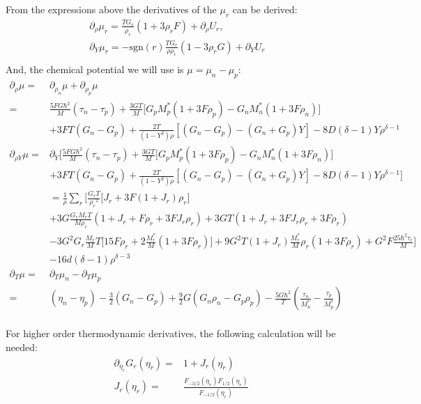 \documentclass[preprint,prc,preprintnumbers,superscriptaddress,amsmath,amssymb,floatfix]{revtex4-1}
\begin{document}
From the expressions above the derivatives of the $\mu_r$ can be derived:
\begin{equation}
 \begin{split}
  \partial_{\rho}\mu_r=\frac{TG_r}{\rho_r}(1+ 3\rho_r F)+\partial_{\rho}U_r,\\
  \partial_{Y}\mu_r=-\text{sgn}(r)\frac{TG_r}{\rho \rho_r}(1-3\rho_r G)+\partial_{Y}U_r&\\
 \end{split}
\end{equation}
And, the chemical potential we will use is $\mu = \mu_n-\mu_p$:
\begin{equation}
 \begin{split}
  \partial_\rho \mu=&\partial_{\rho_n} \mu+\partial_{\rho_p} \mu\\
  =&\frac{5 FG\hbar^2}{M}(\tau_n-\tau_p)+\frac{3GT}{M}\Big[G_p M^{*}_p (1+3F\rho_p)-G_n M^{*}_n(1+3F\rho_n)\Big]\\
  &+3FT(G_n-G_p)+\frac{2T}{(1-Y^2)\rho}[(G_n-G_p)-(G_n+G_p)Y]-8D(\delta-1)Y\rho^{\delta-1}\\
  \partial_{\rho Y} \mu=&\partial_Y\Big[\frac{5 FG\hbar^2}{M}(\tau_n-\tau_p)+\frac{3GT}{M}\Big[G_p M^{*}_p (1+3F\rho_p)-G_n M^{*}_n(1+3F\rho_n)\Big]\\
  &+3FT(G_n-G_p)+\frac{2T}{(1-Y^2)\rho}[(G_n-G_p)-(G_n+G_p)Y]-8D(\delta-1)Y\rho^{\delta-1}\Big]\\
  &=\frac{1}{\rho}\sum_r\Big[\frac{{G_r} T}{{\rho_r}^2} \big[{J_r}+3 F (1+{J_r}) {\rho_r}\big]\\
  &+3G\frac{ {G_r} {M_r} T}{M \rho_r} (1+{J_r}+F {\rho_r}+3 F {J_r} {\rho_r})+3 GT(1+J_r+3 FJ_r\rho_r+3 F\rho_r)\\
  &-3 G^2 G_r \frac{M_r}{M}T\big[15 F \rho_r+2\frac{M_r^{*}}{M}(1+3F\rho_r)\big]+9G^2T(1+J_r)\frac{M_r^{*}}{M}\rho_r(1+3 F \rho_r)+G^2F\frac{25 \hbar^2\tau_r}{M}\Big]\\
  &-16 d (\delta -1) \rho^{\delta -3}\\
  \partial_T\mu =&\partial_{T} \mu_n-\partial_{T} \mu_p\\
  =&(\eta_n-\eta_p)-\frac{3}{2}(G_n-G_p)+\frac{9}{2}G(G_n \rho_n -G_p \rho_p)-\frac{5 G \hbar^2}{T} (\frac{\tau_n}{M^{*}_n}-\frac{\tau_p}{M^{*}_p})\\
  \end{split}
\end{equation}

For higher order thermodynamic derivatives, the following calculation will be needed:
\begin{equation}
 \begin{split}
   \partial_{\eta_r}G_r(\eta_r)=&1+J_r(\eta_r)\\
   J_r(\eta_r)=&\frac{F_{-3/2}(\eta_r)F_{1/2}(\eta_r)}{F_{-1/2}(\eta_r)}
 \end{split}
\end{equation}
\end{document}
